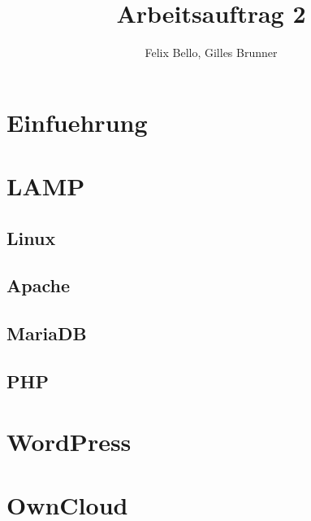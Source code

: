 \documentclass{article}
\author{Felix Bello, Gilles Brunner}
\title{Arbeitsauftrag 2}
\begin{document}
	\maketitle
	\section{Einfuehrung}
	\section{LAMP}
	\subsection{Linux}
	\subsection{Apache}
	\subsection{MariaDB}
	\subsection{PHP}
	\section{WordPress}
	\section{OwnCloud}
\end{document}
